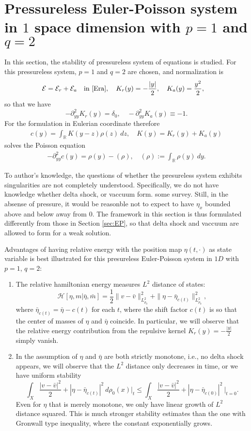 \documentclass[10pt, letterpaper]{article}
\def\blue{\color{blue}}
\def\E{{\mathcal{E}}}
\def\H{{\mathcal{H}}}
\def\dr{{d\rho_0(x)}}
\theoremstyle{definition}
\theoremstyle{remark}
\begin{document}
\section{Pressureless Euler-Poisson system in $1$ space dimension with $p=1$ and $q=2$}
In this section, the stability of pressureless system of equations is studied. For this pressureless system, $p=1$ and $q=2$ are chosen, and normalization is 
\begin{align*}
 &\E = \E_r + \E_a \quad \text{in \eqref{Era}}, \quad K_r(y) = - \frac{|y|}{2}, \quad K_a(y) = \frac{y^2}{2},\end{align*}
so that we have 
$$-\partial^2_{yy} K_r(y) = \delta_0, \quad -\partial^2_{yy} K_a(y) \equiv -1.$$ 
For the formulation in Eulerian coordinate therefore 
\begin{align*}
 c(y) = \int_\mathbb{R} K(y-z) \rho(z)\: dz, \quad K(y) = K_r(y) + K_a(y)
\end{align*}
solves the Poisson equation
\begin{align*}
 -\partial^2_{yy} c(y) = \rho(y) - (\rho), \quad (\rho):=\int_\mathbb{R} \rho(y) \:dy.
\end{align*}

To author's knowledge, the questions of whether the presureless system exhibits singularities are not completely understood. Specifically, we do not have knowledge whether delta shock, or vaccuum form. {\blue some survey}. Still, in the absense of pressure, it would be reasonble not to expect to have $\eta_x$ bounded above and below away from $0$. The framework in this section is thus formulated differently from those in Section \ref{sec:EP}, so that delta shock and vaccuum are allowed to form for a weak solution.

Advantages of having relative energy with the position map $\eta(t,\cdot)$ as state variable is best illustrated for this presureless Euler-Poisson system in $1D$ with $p=1$, $q=2$:
\begin{enumerate}
 \item The relative hamiltonian energy measures $L^2$ distance of states:
 $$ \H[\eta,m|\bar\eta,\bar{m}] = \frac{1}{2} \|v - \bar{v}\|_{L^2_{\rho_0}}^2 + \|\eta - \bar\eta_{c(t)}\|_{L^2_{\rho_0}}^2,$$
 where $\bar\eta_{c(t)} = \bar\eta - c(t)$ for each $t$, where the shift factor $c(t)$ is so that the center of masses of $\eta$ and $\bar\eta$ coincide. In particular, we will observe that the relative energy contribution from the repulsive kernel $K_r(y) = -\frac{|y|}{2}$ simply vanish.
 \item In the assumption of $\eta$ and $\bar\eta$ are both strictly monotone, i.e., no  delta shock appears, we will observe that the $L^2$ distance only decreases in time, or we have uniform stability
 $$\int_X \frac{|v-\bar v|^2}{2} + |\eta - \bar\eta_{c(t)}|^2 \:\dr\bigg|_{t} \le \int_X \frac{|v-\bar v|^2}{2} + |\eta - \bar\eta_{c(0)}|^2 \:\bigg|_{t=0}.$$
 Even for $\eta$ that is merely monotone, we only have linear growth of $L^2$ distance squared. This is much stronger stability estimates than the one with Gronwall type inequality, where the constant exponentially grows.
\end{enumerate}
\end{document}
